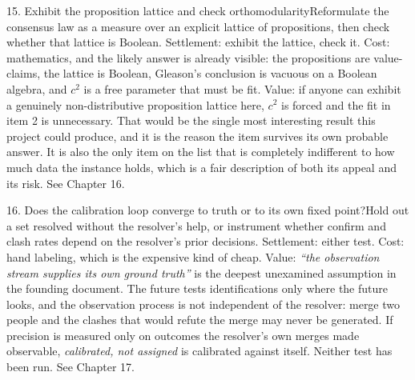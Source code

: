 \begin{Open}{15. Exhibit the proposition lattice and check orthomodularity}{Reformulate the consensus law as a measure over an explicit lattice of propositions, then check whether that lattice is Boolean.}
Settlement: exhibit the lattice, check it. Cost: mathematics, and the likely answer is already visible: the propositions are value-claims, the lattice is Boolean, Gleason's conclusion is vacuous on a Boolean algebra, and $c^2$ is a free parameter that must be fit. Value: if anyone can exhibit a genuinely non-distributive proposition lattice here, $c^2$ is forced and the fit in item 2 is unnecessary. That would be the single most interesting result this project could produce, and it is the reason the item survives its own probable answer. It is also the only item on the list that is completely indifferent to how much data the instance holds, which is a fair description of both its appeal and its risk. See Chapter 16.
\end{Open}

\begin{Open}{16. Does the calibration loop converge to truth or to its own fixed point?}{Hold out a set resolved without the resolver's help, or instrument whether confirm and clash rates depend on the resolver's prior decisions.}
Settlement: either test. Cost: hand labeling, which is the expensive kind of cheap. Value: \textit{``the observation stream supplies its own ground truth''} is the deepest unexamined assumption in the founding document. The future tests identifications only where the future looks, and the observation process is not independent of the resolver: merge two people and the clashes that would refute the merge may never be generated. If precision is measured only on outcomes the resolver's own merges made observable, \textit{calibrated, not assigned} is calibrated against itself. Neither test has been run. See Chapter 17.
\end{Open}

